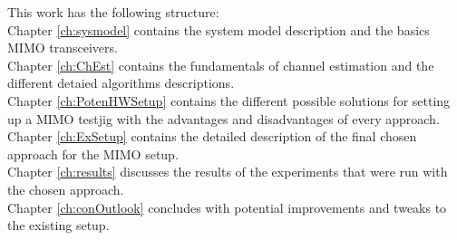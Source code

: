 This work has the following structure: \\

Chapter \ref{ch:sysmodel} contains the system model description and the basics MIMO transceivers.\\
Chapter \ref{ch:ChEst} contains the fundamentals of channel estimation and the different detaied algorithms descriptions. \\
Chapter \ref{ch:PotenHWSetup} contains the different possible solutions for setting up a MIMO testjig with the advantages and disadvantages of every approach. \\
Chapter \ref{ch:ExSetup} contains the detailed description of the final chosen approach for the MIMO setup. \\
Chapter \ref{ch:results} discusses the results of the experiments that were run with the chosen approach. \\
Chapter \ref{ch:conOutlook} concludes with potential improvements and tweaks to the existing setup.

